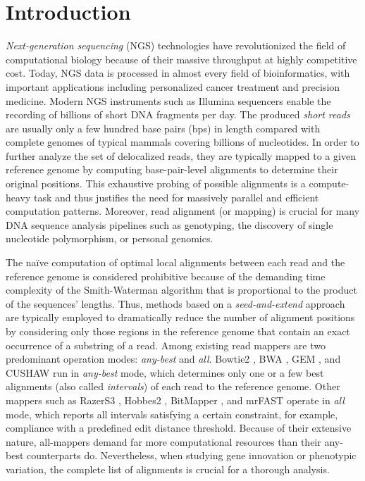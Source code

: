 \section{Introduction}
\label{Introduction}

{\em Next-generation sequencing} (NGS) technologies have
revolutionized the field of computational biology because of their
massive throughput at highly competitive cost. Today, NGS data is
processed in almost every field of bioinformatics, with important
applications including personalized cancer treatment and precision
medicine.  Modern NGS instruments such as Illumina sequencers
\cite{reviewngs} enable the recording of billions of short DNA
fragments per day. The produced \emph{short reads} are usually only a
few hundred base pairs (bps) in length compared with complete genomes
of typical mammals covering billions of nucleotides. In order to
further analyze the set of delocalized reads, they are typically
mapped to a given reference genome by computing base-pair-level
alignments to determine their original positions. This exhaustive
probing of possible alignments is a compute-heavy task and thus
justifies the need for massively parallel and efficient computation
patterns. Moreover, read alignment (or mapping) is crucial for many
DNA sequence analysis pipelines such as genotyping, the discovery of
single nucleotide polymorphism, or personal genomics.

The na\"ive computation of optimal local alignments between each read
and the reference genome is considered prohibitive because of the
demanding time complexity of the Smith-Waterman algorithm \cite{sw}
that is proportional to the product of the sequences' lengths. Thus,
methods based on a {\em seed-and-extend} approach are typically
employed to dramatically reduce the number of alignment positions by
considering only those regions in the reference genome that contain
an exact occurrence of a substring of a read. Among existing read
mappers are two predominant operation modes: {\em any-best}
and {\em all}. Bowtie2 \cite{bowtie2}, BWA \cite{bwa}, GEM \cite{gem},
and CUSHAW \cite{cushaw} run in {\em any-best} mode, which determines
only one or a few best alignments (also called {\em intervals}) of
each read to the reference genome. Other mappers such as RazerS3
\cite{razers3}, Hobbes2 \cite{hobbes2}, BitMapper \cite{bitmapper},
and mrFAST \cite{mrfast} operate in {\em all} mode, which reports all
intervals satisfying a certain constraint, for example, compliance
with a predefined edit distance threshold.  Because of their extensive
nature, all-mappers demand far more computational resources than their
any-best counterparts do. Nevertheless, when studying gene innovation or
phenotypic variation, the complete list of alignments is crucial for a
thorough analysis.

